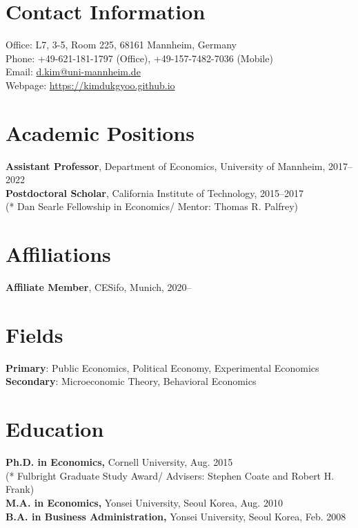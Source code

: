 \documentclass[margin, a4paper]{res}
\begin{document}
 

\begin{resume} 
\section{Contact Information} Office: L7, 3-5, Room 225, 68161 Mannheim, Germany\\
Phone: +49-621-181-1797 (Office), +49-157-7482-7036 (Mobile)\\
Email: \href{mailto:d.kim@uni-mannheim.de}{d.kim@uni-mannheim.de}\\
Webpage: \url{https://kimdukgyoo.github.io}

\section{Academic Positions}
\textbf{Assistant Professor}, Department of Economics, University of Mannheim, 2017--2022\\
\textbf{Postdoctoral Scholar}, California Institute of Technology, 2015--2017\\
(* Dan Searle Fellowship in Economics/ Mentor: Thomas R. Palfrey)

\section{Affiliations}
\textbf{Affiliate Member}, CESifo, Munich, 2020--

\section{Fields}
\textbf{Primary}: Public Economics, Political Economy, Experimental Economics\\
\textbf{Secondary}: Microeconomic Theory, Behavioral Economics

\section{Education} 
\textbf{Ph.D. in Economics,} Cornell University, Aug. 2015\\
(* Fulbright Graduate Study Award/ Advisers: Stephen Coate and Robert H. Frank)\\
\textbf{M.A. in Economics,} Yonsei University, Seoul Korea,  Aug. 2010\\
\textbf{B.A. in Business Administration,} Yonsei University, Seoul Korea, Feb. 2008


\end{resume}
\end{document}
